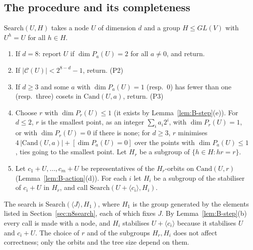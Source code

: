 \documentclass[11pt]{article}
\theoremstyle{definition}
\begin{document}
\subsection{The procedure and its completeness}
$\mathrm{Search}(U,H)$ takes a node $U$ of dimension $d$ and a group
$H\le GL(V)$ with $U^h=U$ for all $h\in H$.
\begin{enumerate}
\item If $d=8$: report $U$ if $\dim P_a(U)=2$ for all $a\neq0$, and return.
\item If $|\mathcal C(U)|<2^{8-d}-1$, return. (P2)
\item If $d\ge3$ and some $a$ with $\dim P_a(U)=1$ (resp.\ $0$) has fewer than one (resp.\ three)
cosets in $\mathrm{Cand}(U,a)$, return. (P3)
\item Choose $r$ with $\dim P_r(U)\le1$ (it exists by Lemma~\ref{lem:B-step}(e)). For $d\le2$, $r$
is the smallest point, as an integer $\sum_ia_i2^i$, with $\dim P_r(U)=1$, or with
$\dim P_r(U)=0$ if there is none; for $d\ge3$, $r$ minimises
$4\,|\mathrm{Cand}(U,a)|+[\dim P_a(U)=0]$ over the points with $\dim P_a(U)\le1$, ties going to
the smallest point. Let $H_r$ be a subgroup of $\{h\in H:hr=r\}$.
\item Let $c_1+U,\dots,c_m+U$ be representatives of the $H_r$-orbits on $\mathrm{Cand}(U,r)$
(Lemma~\ref{lem:B-action}(d)). For each $i$ let $H_i$ be a subgroup of the stabiliser of
$c_i+U$ in $H_r$, and call $\mathrm{Search}(U+\langle c_i\rangle,H_i)$.
\end{enumerate}
The search is $\mathrm{Search}(\langle J\rangle,H_1)$, where $H_1$ is the group generated by the
elements listed in Section~\ref{sec:n8search}, each of which fixes $J$. By
Lemma~\ref{lem:B-step}(b) every call is made with a node, and $H_i$ stabilises
$U+\langle c_i\rangle$ because it stabilises $U$ and $c_i+U$. The choice of $r$ and of the
subgroups $H_r,H_i$ does not affect correctness; only the orbits and the tree size depend on
them.
\end{document}
